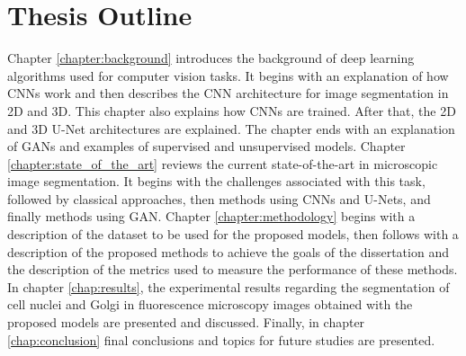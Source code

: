
\section{Thesis Outline}

Chapter \ref{chapter:background} introduces the background of deep learning algorithms used for computer vision tasks. It begins with an explanation of how \ac{CNNs} work and then describes the \ac{CNN} architecture for image segmentation in \ac{2D} and \ac{3D}. This chapter also explains how \ac{CNNs} are trained. After that, the \ac{2D} and \ac{3D} U-Net architectures are explained. The chapter ends with an explanation of \ac{GANs} and examples of supervised and unsupervised models. Chapter \ref{chapter:state_of_the_art} reviews the current state-of-the-art in microscopic image segmentation. It begins with the challenges associated with this task, followed by classical approaches, then methods using \ac{CNNs} and U-Nets, and finally methods using \ac{GAN}. Chapter \ref{chapter:methodology} begins with a description of the dataset to be used for the proposed models, then follows with a description of the proposed methods to achieve the goals of the dissertation and the description of the metrics used to measure the performance of these methods. In chapter \ref{chap:results}, the experimental results regarding the segmentation of cell nuclei and Golgi in fluorescence microscopy images obtained with the proposed models are presented and discussed. Finally, in chapter \ref{chap:conclusion} final conclusions and topics for future studies are presented.